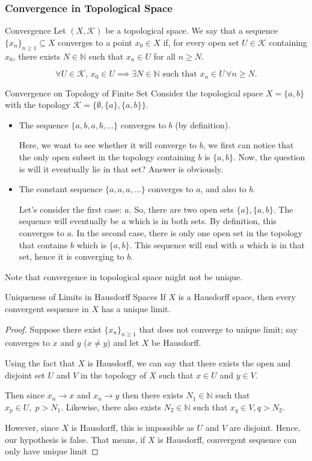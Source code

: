\subsubsection{Convergence in Topological Space}
\begin{defbox}{Convergence}
    Let $(X, \mathcal{K})$ be a topological space. We say that a sequence $\{x_n\}_{n \geq 1} \subseteq X$ converges to a point $x_0 \in X$ if, for every open set $U \in \mathcal{K}$ containing $x_0$, there exists $N \in \mathbb{N}$ such that $x_n \in U$ for all $n \geq N$.

\[
\forall U \in \mathcal{K}, \, x_0 \in U \implies \exists N \in \mathbb{N} \text{ such that } x_n \in U \, \forall n \geq N.
\]
\end{defbox}
\begin{exbox}{Convergence on Topology of Finite Set}
    Consider the topological space $X = \{a, b\}$ with the topology $\mathcal{K} = \{\emptyset, \{a\}, \{a, b\}\}$. 

\begin{itemize}
    \item The sequence $\{a, b, a, b, \dots\}$ converges to $b$ (by definition).

    Here, we want to see whether it will converge to $b$, we first can notice that the only open subset in the topology containing $b$ is $\{a,b\}$. Now, the question is will it eventually lie in that set? Answer is obviously.
    \item The constant sequence $\{a, a, a, \dots\}$ converges to $a$, and also to $b$.
    
    Let's consider the first case: $a$. So, there are two open sets $\{a\}, \{a,b\}$. The sequence will eventually be $a$ which is in both sets. By definition, this converges to $a$. In the second case, there is only one open set in the topology that contains $b$ which is $\{a,b\}$. This sequence will end with $a$ which is in that set, hence it is converging to $b$.
\end{itemize}
Note that convergence in topological space might not be unique.
\end{exbox}
\begin{thmbox}{Uniqueness of Limits in Hausdorff Spaces}
If $X$ is a Hausdorff space, then every convergent sequence in $X$ has a unique limit.
\end{thmbox}
\begin{proof}
    Suppose there exist $\{x_n\}_{n\geq 1}$ that does not converge to unique limit; say converges to $x$ and $y$ ($x\neq y$) and let $X$ be Hausdorff.
    
    Using the fact that $X$ is Hausdorff, we can say that there exists the open and disjoint set $U$ and $V$ in the topology of $X$ such that $x\in U$ and $y\in V$.

    Then since $x_n \rightarrow x$ and $x_n\rightarrow y$ then there exists $N_1\in\mathbb{N}$ such that $x_{p} \in U,\; p > N_1$. Likewise, there also exists $N_2 \in \mathbb{N}$ such that $x_{q} \in V, q > N_2$.

    However, since $X$ is Hausdorff, this is impossible as $U$ and $V$ are disjoint. Hence, our hypothesis is false. That means, if $X$ is Hausdorff, convergent sequence can only have unique limit
\end{proof} 
